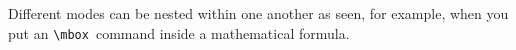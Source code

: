 \documentclass{article}
\begin{document}
Different modes can be nested within one another as seen, for example, when you put an 
{\tt \textbackslash mbox}~command inside a mathematical formula.

\end{document}
